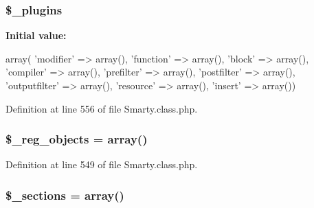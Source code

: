 \hypertarget{class_smarty_a5e55c6109989b57b8cd655f6ad56bb61}{
\subsubsection[{\$\-\_\-plugins}]{\setlength{\rightskip}{0pt plus 5cm}\$\-\_\-plugins}}\label{class_smarty_a5e55c6109989b57b8cd655f6ad56bb61}
{\bfseries \-Initial value\-:}
\begin{DoxyCode}
 array(
                                       'modifier'      => array(),
                                       'function'      => array(),
                                       'block'         => array(),
                                       'compiler'      => array(),
                                       'prefilter'     => array(),
                                       'postfilter'    => array(),
                                       'outputfilter'  => array(),
                                       'resource'      => array(),
                                       'insert'        => array())
\end{DoxyCode}


\-Definition at line 556 of file \-Smarty.\-class.\-php.

\hypertarget{class_smarty_a89d5e48a4a6c2e53471a755ff63acb69}{
\subsubsection[{\$\-\_\-reg\-\_\-objects}]{\setlength{\rightskip}{0pt plus 5cm}\$\-\_\-reg\-\_\-objects = array()}}\label{class_smarty_a89d5e48a4a6c2e53471a755ff63acb69}


\-Definition at line 549 of file \-Smarty.\-class.\-php.

\hypertarget{class_smarty_a873245595639c46ba0a649d9d0abc018}{
\subsubsection[{\$\-\_\-sections}]{\setlength{\rightskip}{0pt plus 5cm}\${\bf \-\_\-sections} = array()}}\label{class_smarty_a873245595639c46ba0a649d9d0abc018}


